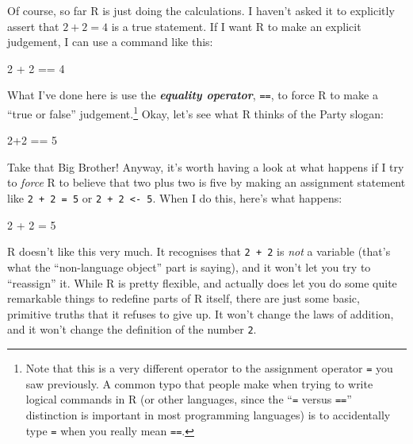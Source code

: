 \documentclass[
]{book}
\newenvironment{Shaded}{\begin{snugshade}}{\end{snugshade}}
\newcommand{\DecValTok}[1]{\textcolor[rgb]{0.00,0.00,0.81}{#1}}
\newcommand{\OtherTok}[1]{\textcolor[rgb]{0.56,0.35,0.01}{#1}}
\newcommand{\SpecialCharTok}[1]{\textcolor[rgb]{0.00,0.00,0.00}{#1}}
\begin{document}
Of course, so far R is just doing the calculations. I haven't asked it to explicitly assert that \(2+2 = 4\) is a true statement. If I want R to make an explicit judgement, I can use a command like this:

\begin{Shaded}
\begin{Highlighting}[]
\DecValTok{2} \SpecialCharTok{+} \DecValTok{2} \SpecialCharTok{==} \DecValTok{4}
\end{Highlighting}
\end{Shaded}

What I've done here is use the \textbf{\emph{equality operator}}, \texttt{==}, to force R to make a ``true or false'' judgement.\footnote{Note that this is a very different operator to the assignment operator \texttt{=} you saw previously. A common typo that people make when trying to write logical commands in R (or other languages, since the ``\texttt{=} versus \texttt{==}'' distinction is important in most programming languages) is to accidentally type \texttt{=} when you really mean \texttt{==}.} Okay, let's see what R thinks of the Party slogan:

\begin{Shaded}
\begin{Highlighting}[]
\DecValTok{2}\SpecialCharTok{+}\DecValTok{2} \SpecialCharTok{==} \DecValTok{5}
\end{Highlighting}
\end{Shaded}

Take that Big Brother! Anyway, it's worth having a look at what happens if I try to \emph{force} R to believe that two plus two is five by making an assignment statement like \texttt{2\ +\ 2\ =\ 5} or \texttt{2\ +\ 2\ \textless{}-\ 5}. When I do this, here's what happens:

\begin{Shaded}
\begin{Highlighting}[]
\DecValTok{2} \SpecialCharTok{+} \DecValTok{2} \OtherTok{=} \DecValTok{5}
\end{Highlighting}
\end{Shaded}

R doesn't like this very much. It recognises that \texttt{2\ +\ 2} is \emph{not} a variable (that's what the ``non-language object'' part is saying), and it won't let you try to ``reassign'' it. While R is pretty flexible, and actually does let you do some quite remarkable things to redefine parts of R itself, there are just some basic, primitive truths that it refuses to give up. It won't change the laws of addition, and it won't change the definition of the number \texttt{2}.
\end{document}
